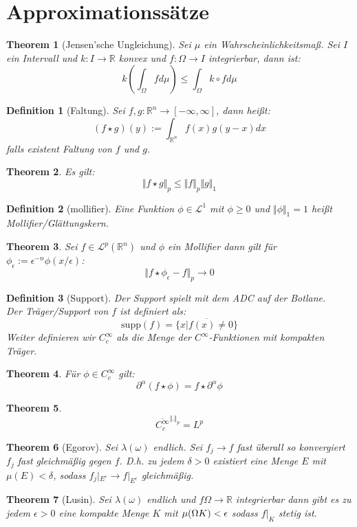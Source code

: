 \documentclass[10pt,a4paper]{article}
\newtheorem{theorem}{Theorem}
\newtheorem{definition}{Definition}
\begin{document}
\section{Approximationssätze}
\begin{theorem}[Jensen'sche Ungleichung]
	Sei $\mu$ ein Wahrscheinlichkeitsmaß. Sei $I$ ein Intervall und $k: I \to \mathbb{R}$ konvex und $f: \Omega \to I$ integrierbar, dann ist: 
	$$k(\int_\Omega f d\mu) \leq \int_\Omega k\circ f d\mu$$
\end{theorem}
\begin{definition}[Faltung]
	Sei $f,g: \mathbb{R}^n \to [-\infty, \infty]$, dann heißt:
	$$(f\star g )(y) := \int_{\mathbb{R}^n}f(x)g(y-x)dx$$
	falls existent Faltung von $f$ und $g$.
\end{definition}
\begin{theorem}
	Es gilt:
	$$\Vert f\star g\Vert_p \leq \Vert f\Vert_p\Vert g\Vert_1$$
\end{theorem}
\begin{definition}[mollifier]
	Eine Funktion $\phi\in\mathcal{L}^1 $ mit $\phi\geq 0$ und $\Vert \phi \Vert_1 = 1$ heißt Mollifier/Glättungskern.
\end{definition}
\begin{theorem}
	Sei $f\in \mathcal{L}^p(\mathbb{R}^n)$ und $\phi$ ein Mollifier dann gilt für $\phi_\epsilon:= \epsilon^{-n}\phi(x/\epsilon)$:
	$$\Vert f\star \phi_\epsilon -f\Vert_p \to 0$$
\end{theorem}
\begin{definition}[Support]
	Der Support spielt mit dem ADC auf der Botlane. \\
	Der Träger/Support von $f$ ist definiert als:
	$$\text{supp}(f) = \overline{\{x | f(x) \neq 0\}}$$
	Weiter definieren wir $C^\infty_c$ als die Menge der $C^\infty$-Funktionen mit kompakten Träger.
\end{definition}
\begin{theorem}
	Für $\phi \in C_c^\infty$ gilt:
	$$\partial^\alpha(f\star \phi) = f\star \partial^\alpha\phi$$
\end{theorem}
\begin{theorem}
	$$\overline{C_c^\infty}^{\Vert . \Vert_p} = L^p$$
\end{theorem}
\begin{theorem}[Egorov]
	Sei $\lambda(\omega)$ endlich. Sei $f_j \to f$ fast überall so konvergiert $f_j$ fast gleichmäßig gegen $f$. D.h. zu jedem $\delta > 0$ existiert eine Menge $E$ mit $\mu(E) < \delta$, sodass $f_j|_{E^c} \to f|_{E^c}$ gleichmäßig.
\end{theorem}
\begin{theorem}[Lusin]
	Sei $\lambda(\omega)$ endlich und $f \Omega \to \mathbb{R}$ integrierbar dann gibt es zu jedem $\epsilon > 0$ eine kompakte Menge $K$ mit $\mu(\Omega\\K) < \epsilon$ sodass $f|_K$ stetig ist.  
\end{theorem}
\end{document}
